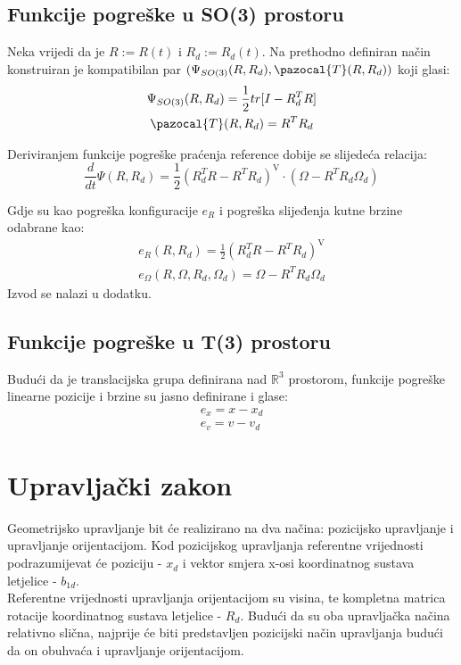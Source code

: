 \documentclass[times, utf8, diplomski]{fer}
\newcommand{\Ta}{\pazocal{T}}
\begin{document}
	\newpage
	\clearpage
	
	\subsection{Funkcije pogreške u SO(3) prostoru}
	Neka vrijedi da je $R := R(t)$ i $R_d := R_d(t)$. Na prethodno definiran način konstruiran je kompatibilan par $(\Psi_{SO(3)}(R, R_d), \Ta(R, R_d))$ koji glasi:
	\begin{gather}
		\Psi_{SO(3)}(R, R_d) = \frac{1}{2} tr[I - R_d^T R] \\
		\Ta(R, R_d) = R^T R_d
	\end{gather}
	
	Deriviranjem funkcije pogreške praćenja reference dobije se slijedeća relacija:
	\begin{equation}
		\frac{d}{dt} \Psi(R, R_d) = \frac{1}{2}(R_d^TR - R^TR_d)^{\text{V}} \cdot (\Omega - R^TR_d\Omega_d)
	\end{equation}
	
	Gdje su kao pogreška konfiguracije $e_R$ i pogreška slijeđenja kutne brzine odabrane kao: 
	\begin{gather}
		e_R(R, R_d) = \frac{1}{2}(R_d^TR - R^TR_d)^{\text{V}} \label{e_R}\\
		e_{\Omega}(R, \Omega, R_d, \Omega_d) = \Omega - R^TR_d\Omega_d \label{e_omega}
	\end{gather}
	Izvod se nalazi u dodatku.
	
	\subsection{Funkcije pogreške u T(3) prostoru}
	Budući da je translacijska grupa definirana nad $\mathbb{R}^3$ prostorom, funkcije pogreške linearne pozicije i brzine su jasno definirane i glase:
	\begin{gather}
		e_x = x - x_d \\
		e_v = v - v_d \label{e_v}
	\end{gather}
	
	\newpage
	\clearpage
	
\section{Upravljački zakon}

	Geometrijsko upravljanje bit će realizirano na dva načina: pozicijsko upravljanje i upravljanje orijentacijom. Kod pozicijskog upravljanja referentne vrijednosti podrazumijevat će poziciju - $x_d$ i vektor smjera x-osi koordinatnog sustava letjelice - $b_{1d}$. \\
	Referentne vrijednosti upravljanja orijentacijom su visina, te kompletna matrica rotacije koordinatnog sustava letjelice - $R_d$.
	Budući da su oba upravljačka načina relativno slična, najprije će biti predstavljen pozicijski način upravljanja budući da on obuhvaća i upravljanje orijentacijom. 
	
\end{document}
